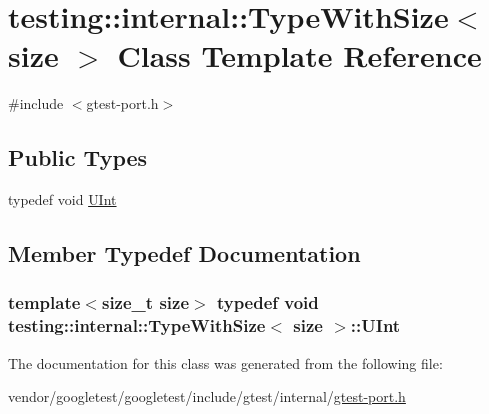 \hypertarget{classtesting_1_1internal_1_1TypeWithSize}{}\section{testing\+:\+:internal\+:\+:Type\+With\+Size$<$ size $>$ Class Template Reference}
\label{classtesting_1_1internal_1_1TypeWithSize}


{\ttfamily \#include $<$gtest-\/port.\+h$>$}

\subsection*{Public Types}
\begin{DoxyCompactItemize}
\item 
typedef void \hyperlink{classtesting_1_1internal_1_1TypeWithSize_a3898640d9f6c1e18110eef90f47a5d7b}{U\+Int}
\end{DoxyCompactItemize}


\subsection{Member Typedef Documentation}
\subsubsection[{\texorpdfstring{U\+Int}{UInt}}]{\setlength{\rightskip}{0pt plus 5cm}template$<$size\+\_\+t size$>$ typedef void {\bf testing\+::internal\+::\+Type\+With\+Size}$<$ size $>$\+::{\bf U\+Int}}\hypertarget{classtesting_1_1internal_1_1TypeWithSize_a3898640d9f6c1e18110eef90f47a5d7b}{}\label{classtesting_1_1internal_1_1TypeWithSize_a3898640d9f6c1e18110eef90f47a5d7b}


The documentation for this class was generated from the following file\+:\begin{DoxyCompactItemize}
\item 
vendor/googletest/googletest/include/gtest/internal/\hyperlink{gtest-port_8h}{gtest-\/port.\+h}\end{DoxyCompactItemize}
